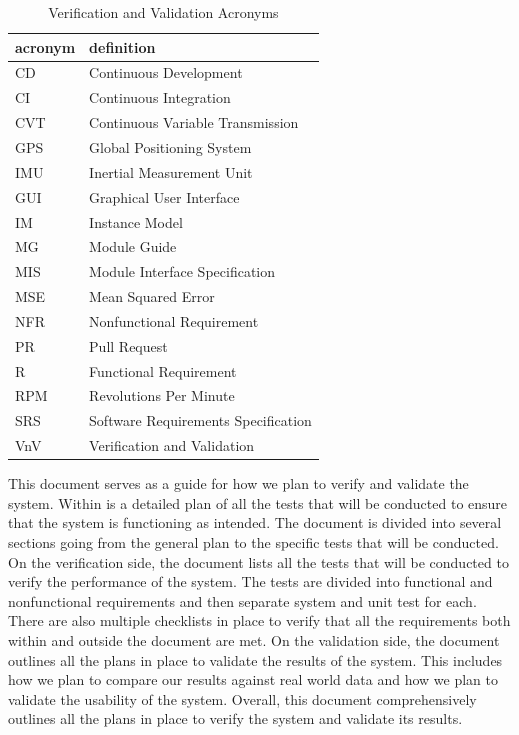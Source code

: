 \documentclass[12pt, titlepage]{article}
\begin{document}
\begin{table}[h]
  \raggedright
  \begin{tabular}{l l} 
    \toprule		
    \textbf{acronym} & \textbf{definition}\\
    \midrule
    CD & Continuous Development\\
    CI & Continuous Integration\\ 
    CVT & Continuous Variable Transmission\\
    GPS & Global Positioning System\\
    IMU & Inertial Measurement Unit\\
    GUI & Graphical User Interface\\
    IM & Instance Model\\
    MG & Module Guide\\
    MIS & Module Interface Specification\\
    MSE & Mean Squared Error\\
    NFR & Nonfunctional Requirement\\
    PR & Pull Request\\
    R & Functional Requirement\\
    RPM & Revolutions Per Minute\\
    SRS & Software Requirements Specification\\
    VnV & Verification and Validation\\
    \bottomrule
  \end{tabular}
  \caption{Verification and Validation Acronyms}
  \label{tab:vnv_acronyms}
\end{table}

\newpage


\noindent This document serves as a guide for how we plan to verify and validate the \progname{} system.
Within is a detailed plan of all the tests that will be conducted to ensure that the system is functioning as intended.
The document is divided into several sections going from the general plan to the specific tests that will be conducted.
On the verification side, the document lists all the tests that will be conducted to verify the performance of the system.
The tests are divided into functional and nonfunctional requirements and then separate system and unit test for each.
There are also multiple checklists in place to verify that all the requirements both within and outside the document are met.
On the validation side, the document outlines all the plans in place to validate the results of the system.
This includes how we plan to compare our results against real world data and how we plan to validate the usability of the system.
Overall, this document comprehensively outlines all the plans in place to verify the system and validate its results.
\end{document}
